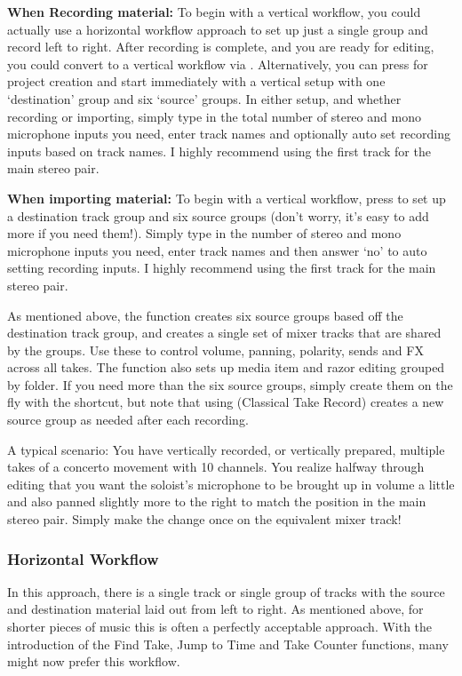 \documentclass[10pt,american]{article}
\begin{document}
\textbf{When Recording material:} To begin with a vertical workflow, you could
actually use a horizontal workflow approach  to set up just a single
group and record left to right. After recording is complete, and you are ready
for editing, you could convert to a vertical workflow via .
Alternatively, you can press  for project creation and start
immediately with a vertical setup with one `destination' group and six `source'
groups. In either setup, and whether recording or importing, simply type in the
total number of stereo and mono microphone inputs you need, enter track names
and optionally auto set recording inputs based on track names. I highly
recommend using the first track for the main stereo pair. 

\textbf{When importing material:} To begin with a vertical workflow, press
 to set up a destination track group and six source groups (don't
worry, it's easy to add more if you need them!). Simply type in the number of
stereo and mono microphone inputs you need, enter track names and then answer
`no' to auto setting recording inputs. I highly recommend using the first track
for the main stereo pair. 

As mentioned above, the  function creates six source groups based off
the destination track group, and creates a single set of mixer tracks that are
shared by the groups. Use these to control volume, panning, polarity, sends and
FX across all takes. The function also sets up media item and razor editing
grouped by folder. If you need more than the six source groups, simply create
them on the fly with the \keys{\textbackslash} shortcut, but note that using
 (Classical Take Record) creates a new source group as needed after
each recording.

A typical scenario: You have vertically recorded, or vertically prepared,
multiple takes of a concerto movement with 10 channels. You realize halfway
through editing that you want the soloist's microphone to be brought up in
volume a little and also panned slightly more to the right to match the position
in the main stereo pair. Simply make the change once on the equivalent mixer
track!

\subsubsection{Horizontal Workflow}

In this approach, there is a single track or single group of tracks with the
source and destination material laid out from left to right. As mentioned above,
for shorter pieces of music this is often a perfectly acceptable approach. With
the introduction of the Find Take, Jump to Time and Take Counter functions, many
might now prefer this workflow.
\end{document}
